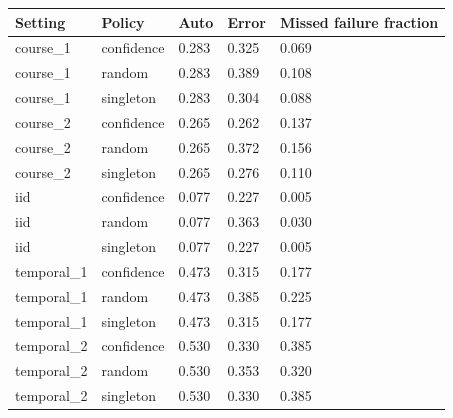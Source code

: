 \begin{tabular}{lllll}
\toprule
Setting & Policy & Auto & Error & Missed failure fraction\\
\midrule
course\_1 & confidence & 0.283 & 0.325 & 0.069\\
course\_1 & random & 0.283 & 0.389 & 0.108\\
course\_1 & singleton & 0.283 & 0.304 & 0.088\\
course\_2 & confidence & 0.265 & 0.262 & 0.137\\
course\_2 & random & 0.265 & 0.372 & 0.156\\
course\_2 & singleton & 0.265 & 0.276 & 0.110\\
iid & confidence & 0.077 & 0.227 & 0.005\\
iid & random & 0.077 & 0.363 & 0.030\\
iid & singleton & 0.077 & 0.227 & 0.005\\
temporal\_1 & confidence & 0.473 & 0.315 & 0.177\\
temporal\_1 & random & 0.473 & 0.385 & 0.225\\
temporal\_1 & singleton & 0.473 & 0.315 & 0.177\\
temporal\_2 & confidence & 0.530 & 0.330 & 0.385\\
temporal\_2 & random & 0.530 & 0.353 & 0.320\\
temporal\_2 & singleton & 0.530 & 0.330 & 0.385\\
\bottomrule
\end{tabular}
